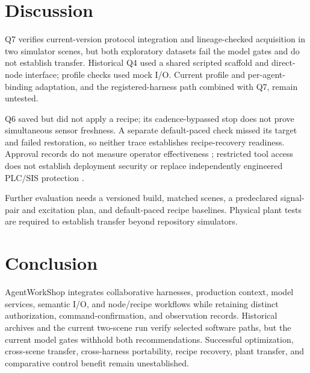 \section{Discussion}
\label{sec:limits}
Q7 verifies current-version protocol integration and lineage-checked
acquisition in two simulator scenes, but both exploratory datasets fail the
model gates and do not establish transfer. Historical Q4 used a shared
scripted scaffold and direct-node interface; profile checks used mock I/O.
Current profile and per-agent-binding adaptation, and the registered-harness
path combined with Q7, remain untested.

Q6 saved but did not apply a recipe; its cadence-bypassed stop does not prove
simultaneous sensor freshness. A separate default-paced check missed its
target and failed restoration, so neither trace establishes recipe-recovery
readiness. Approval records do not measure operator effectiveness
\cite{parasuramanmanzey2010complacency,parasuraman2000model,bainbridge1983ironies};
restricted tool access does not establish deployment security
\cite{greshake2023injection,liu2024pinjection,iec62443-3-3} or replace
independently engineered PLC/SIS protection \cite{iec61511}.

Further evaluation needs a versioned build, matched scenes, a predeclared
signal-pair and excitation plan, and default-paced recipe baselines. Physical
plant tests are required to establish transfer beyond repository simulators.

\newpage
\section{Conclusion}
\label{sec:conclusion}
AgentWorkShop integrates collaborative harnesses, production context, model
services, semantic I/O, and node/recipe workflows while retaining distinct
authorization, command-confirmation, and observation records. Historical
archives and the current two-scene run verify selected software paths, but
the current model gates withhold both recommendations. Successful
optimization, cross-scene transfer, cross-harness portability, recipe
recovery, plant transfer, and comparative control benefit remain unestablished.

